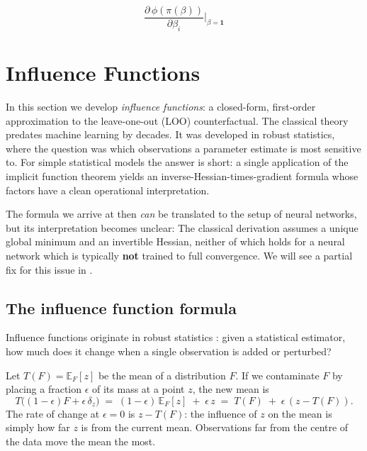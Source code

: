 \documentclass[11pt]{article}
\begin{document}
\begin{equation}\label{eq:holy-grail}
  \boxed{\;\frac{\partial\,\phi(\pi(\beta))}{\partial \beta_i}\bigg|_{\beta = \mathbf{1}}\;}
\end{equation}





\section{Influence Functions}\label{sec:influence}

In this section we develop \emph{influence functions}: a closed-form, first-order approximation to the leave-one-out (LOO) counterfactual. The classical theory \citep{hampel1974,cook1977} predates machine learning by decades. It was developed in robust statistics, where the question was which observations a parameter estimate is most sensitive to. For simple statistical models the answer is short: a single application of the implicit function theorem yields an inverse-Hessian-times-gradient formula whose factors have a clean operational interpretation.

The formula we arrive at then \emph{can} be translated to the setup of neural networks, but its interpretation becomes unclear: The classical derivation assumes a unique global minimum and an invertible Hessian, neither of which holds for a neural network which is typically \textbf{not} trained to full convergence. We will see a partial fix for this issue in .

\subsection{The influence function formula}\label{subsec:if-formula}

Influence functions originate in robust statistics \citep{hampel1974}: given a statistical estimator, how much does it change when a single observation is added or perturbed?

\begin{example}\label{ex:mean-if}
Let $T(F) = \mathbb{E}_F[z]$ be the mean of a distribution $F$. If we contaminate $F$ by placing a fraction $\epsilon$ of its mass at a point $z$, the new mean is
\[
  T\bigl((1-\epsilon)F + \epsilon\,\delta_z\bigr) \;=\; (1-\epsilon)\,\mathbb{E}_F[z] \;+\; \epsilon\,z \;=\; T(F) \;+\; \epsilon\,(z - T(F)).
\]
The rate of change at $\epsilon = 0$ is $z - T(F)$: the influence of $z$ on the mean is simply how far $z$ is from the current mean. Observations far from the centre of the data move the mean the most.
\end{example}
\end{document}
